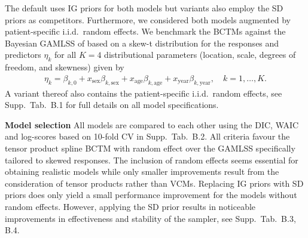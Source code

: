 \documentclass[12pt]{article}
\theoremstyle{plain}
\begin{document}
The default uses IG priors for both models but variants also employ the SD priors as competitors. Furthermore, we considered both models augmented by patient-specific i.i.d.\ random effects. We benchmark the BCTMs against the Bayesian GAMLSS of \citet{MicKleKne2018} based on a skew-t distribution for the responses and predictors $\eta_k$ for all $K=4$ distributional parameters (location, scale, degrees of freedom, and skewness)  given by
\begin{align*}
    \eta_k  = \beta_{k,0}  + x_{\text{sex}} \beta_{k,\text{sex}}  + x_{\text{age}} \beta_{k,\text{age}}  + x_{\text{year}} \beta_{k,\text{year}}, \quad k=1,\ldots,K.
\end{align*}
A variant thereof also contains the patient-specific i.i.d.\ random effects, see Supp.~Tab.~B.1 for full details on all model specifications.

\noindent\textbf{Model selection}
All models are compared to each other using the DIC, WAIC and log-scores based on 10-fold CV in Supp.~Tab.~B.2. All criteria  favour the tensor product spline BCTM with random effect over the GAMLSS specifically tailored to skewed responses. The inclusion of random effects seems essential for obtaining realistic models while only smaller improvements result from the consideration of tensor products rather than VCMs. Replacing IG priors with SD priors does only yield  a small performance improvement for the models without random effects. However, applying the SD prior results in noticeable improvements in effectiveness and stability of the sampler, see Supp.~Tab.~B.3, B.4.
\end{document}
